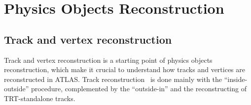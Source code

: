 \chapter{Physics Objects Reconstruction}
\section{Track and vertex reconstruction}

Track and vertex reconstruction is a starting point of physics objects reconstruction, 
which make it crucial to understand how tracks and vertices are reconstructed in ATLAS.
Track reconstruction~\cite{ATLAS-CONF-2012-042,PERF-2015-08} is done 
mainly with the ``inside-outside'' procedure, complemented by the ``outside-in'' 
and the reconstructing of TRT-standalone tracks. 

